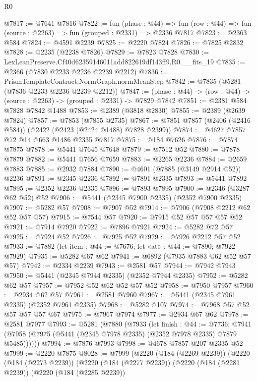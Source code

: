 \begin{lexlean}{R0}
\begin{coremodule}
@7817 := @7641 @7816
@7822 := fun (phase : @44) =>
  fun (row : @44) => fun (source : @2263) => fun (grouped : @2331) => @2336 @7817
@7823 := @2363 @584
@7824 := @4591 @2239
@7825 := @2220 @7824
@7826 := @7825 @2832
@7828 := @2235 (@2238 @7826)
@7829 := @7823 @7828
@7830 := LexLeanPreserve.Cf40d62359146011add822619df143ff9.R0.__fits_19
@7835 := @2366 (@7830 @2233 @2236 @2239 @2212)
@7836 := PrismTemplateContract.NormGraph.normMeanStep
@7842 := @7835 (@5281 (@7836 @2233 @2236 @2239 @2212))
@7847 := (phase : @44) -> (row : @44) -> (source : @2263) -> (grouped : @2331) -> @7829 @7842
@7851 := @2381 @584 @7828 @7842 @1488
@7853 := @2389 (@3818 @2830)
@7855 := @2389 (@2639 @7824)
@7857 := @7853 (@7855 @2735)
@7867 := @7851 @7857 (@2406 (@2416 @584)) (@2422 (@2423 (@2424 @1488) @7828 @2399))
@7874 := @4627 @7857 @72 @14 @663 @1486 @2335 @7817
@7875 := @184 @7626
@7876 := @7874 @7875
@7878 := @5441 @7645 @7648
@7879 := @7512 @52
@7880 := @7878 @7879
@7882 := @5441 @7656 @7659
@7883 := @2265 @2236
@7884 := @2659 @7883
@7885 := @2932 @7884
@7890 := @4601 (@7885 (@3149 @2914 @52)) @2236
@7891 := @2345 @2236
@7892 := @7891 @2335
@7893 := @5441 @7892
@7895 := @2352 @2236 @2335
@7896 := @7893 @7895
@7900 := @2346 (@3287 @62 @52) @52
@7906 := @5441 (@2345 @7900 @2335) (@2352 @7900 @2335)
@7907 := @5282 @57
@7908 := @7907 @52
@7914 := @7906 (@7908 @2212 @62 @52 @57 @57)
@7915 := @7544 @57
@7920 := @7915 @52 @57 @57 @57 @52
@7921 := @7914 @7920
@7922 := @7896 @7921
@7924 := @5282 @72 @57
@7925 := @7924 @52
@7926 := @7925 @52
@7929 := @7926 @2212 @57 @52
@7933 := @7882 (let item : @44 := @7676; let «at» : @44 := @7890; @7922 @7929)
@7935 := @5282 @67 @62
@7941 := @6892 (@7935 @7883 @62 @52 @57 @57)
@7942 := @2334 @2239
@7943 := @2581 @57
@7944 := @7942 @7943
@7950 := @5441 (@2345 @7944 @2335) (@2352 @7944 @2335)
@7952 := @5282 @62 @57
@7957 := @7952 @52 @62 @52 @57 @52
@7958 := @7950 @7957
@7960 := @2934 @62 @57
@7961 := @2581 @7960
@7967 := @5441 (@2345 @7961 @2335) (@2352 @7961 @2335)
@7968 := @5282 @107
@7974 := @7968 @57 @52 @57 @57 @57 @67
@7975 := @7967 @7974
@7977 := @2934 @67 @62
@7978 := @2581 @7977
@7993 := @5281
    (@7880
      (@7933
        (let finish : @44 := @7736;
        @7941 (@7958 (@7975 (@5441 (@2345 @7978 @2335) (@2352 @7978 @2335) @7879 @5485))))))
@7994 := @7876 @7993
@7998 := @4678 @7857 @207 @2335 @52
@7999 := @2220 @7875
@8028 := @7999
    (@2220
      (@184 (@2269 @2239))
      (@2220
        (@184 (@2273 @2239))
        (@2220
          (@184 (@2277 @2239))
          (@2220
            (@184 (@2281 @2239))
            (@2220
              (@184 (@2285 @2239))

\end{coremodule}
\end{lexlean}

